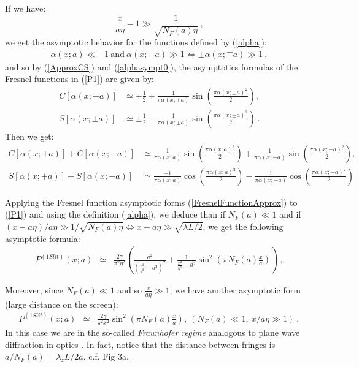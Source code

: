 \documentclass[12pt]{article}   %
\begin{document}
{
If we have: $$\frac{x}{a\eta}-1\gg \frac{1}{\sqrt{N_F(a)\eta}}\ ,$$ 
we get the asymptotic behavior for the functions defined by (\ref{alpha}):
\begin{eqnarray}\label{alphasympt0}
\alpha(x;a)\ll-1\ \mathrm{and}\ \alpha(x;-a)\gg1 \Leftrightarrow \pm\alpha(x;\mp a)\gg1\ ,
\end{eqnarray}
and so by (\ref{ApproxCS}) and (\ref{alphasympt0}),
the asymptotics formulas of the Fresnel functions in (\ref{P1}) are given by:
\begin{align}\label{CSasympt1}
C[\alpha(x;\pm a)] &\simeq \pm\frac{1}{2} + \frac{1}{\pi\alpha(x;\pm a)}\sin{(\frac{\pi\alpha(x;\pm a)^2}{2})},
{}\nonumber\\{} S[\alpha(x;\pm a)] &\simeq \pm\frac{1}{2} - \frac{1}{\pi\alpha(x;\pm a)}\sin{(\frac{\pi\alpha(x;\pm a)^2}{2})}\ .
\end{align}}
{Then we get:
\begin{align}\label{FresnelFunctionApprox}
 C[\alpha(x;+a)]+C[\alpha(x;-a)] &\simeq \frac{1}{\pi\alpha(x;a)}\sin{(\frac{\pi\alpha(x;a)^2}{2})}
+\frac{1}{\pi\alpha(x;-a)}\sin{(\frac{\pi\alpha(x;-a)^2}{2})},
{}\nonumber\\{} S[\alpha(x;+a)]+S[\alpha(x;-a)] &\simeq \frac{-1}{\pi\alpha(x;a)}\cos{(\frac{\pi\alpha(x;a)^2}{2})}
-\frac{1}{\pi\alpha(x;-a)}\cos{(\frac{\pi\alpha(x;-a)^2}{2})}
\end{align}}


Applying the Fresnel function asymptotic forms (\ref{FresnelFunctionApprox}) to
(\ref{P1}) and using the definition (\ref{alpha}), we deduce than if $N_F(a)\ll 1$ and
if $(x-a\eta)/a\eta\gg 1/\sqrt{N_F(a)\eta}\Leftrightarrow
x-a\eta\gg\sqrt{\lambda L/2}$, we get the following asymptotic
formula:
\begin{eqnarray}\label{P1ApproxNFsmall0}
P^{(1 Slit)}(x;a)&\simeq&\frac{2\gamma}{\pi^2\eta^2}
\left(\frac{a^2}{(\frac{x^2}{\eta^2}-a^2)^2} +
\frac{1}{\frac{x^2}{\eta^2}-a^2}\sin^2{(\pi N_F(a)
\frac{x}{a})}\right) \ ,
\end{eqnarray}


Moreover, since $N_F(a)\ll1$ and so $\frac{x}{a\eta}\gg1$, we have another asymptotic form
(large distance on the screen):
\begin{eqnarray}\label{P1ApproxNFsmall}
P^{(1 Slit)}(x;a)&\simeq&\frac{2\gamma}{\pi^2 x^2} \sin^2{(\pi
N_F(a) \frac{x}{a})},\ (N_F(a)\ll1,\ x/a\eta\gg 1)\ ,
\end{eqnarray}
In this case we are in the so-called \textit{Fraunhofer regime}
analogous to plane wave diffraction in optics \cite{Optics}. In
fact, notice that the distance between fringes is
$a/N_F(a)=\lambda_z L/2a$, c.f. Fig 3a.
\end{document}
